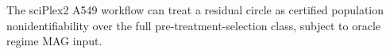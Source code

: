 The sciPlex2 A549 workflow can treat a residual circle as certified population nonidentifiability over the full pre-treatment-selection class, subject to oracle regime MAG input.